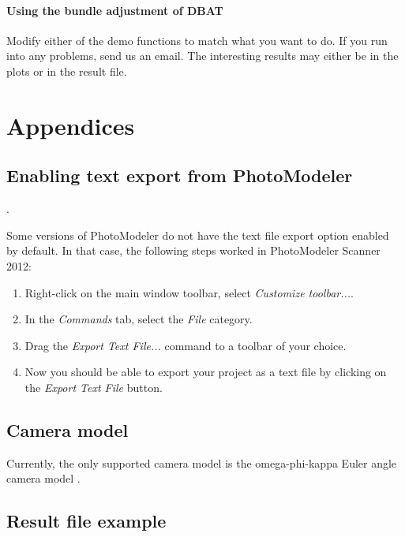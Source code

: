 \documentclass{article}
\begin{document}
\paragraph{Using the bundle adjustment of DBAT}

Modify either of the demo functions to match what you want to do. If
you run into any problems, send us an email. The interesting results
may either be in the plots or in the result file.

\newpage



\newpage

\appendix

\section{Appendices}

\subsection{Enabling text export from PhotoModeler}
\label{sec:enableTextExport}.

Some versions of PhotoModeler do not have the text file export option
enabled by default. In that case, the following steps worked in
PhotoModeler Scanner 2012:
\begin{enumerate}
\item Right-click on the main window toolbar, select \emph{Customize toolbar...}.
\item In the \emph{Commands} tab, select the \emph{File} category.
\item Drag the \emph{Export Text File...} command to a toolbar of
  your choice.
\item Now you should be able to export your project as a text file by
  clicking on the \emph{Export Text File} button.
\end{enumerate}


\subsection{Camera model}

Currently, the only supported camera model is the omega-phi-kappa
Euler angle camera model \citep[Ch.~2.1.2.3]{McGlone2004:Manual}.

\subsection{Result file example}
\label{sec:resultFile}

\scriptsize

\end{document}
